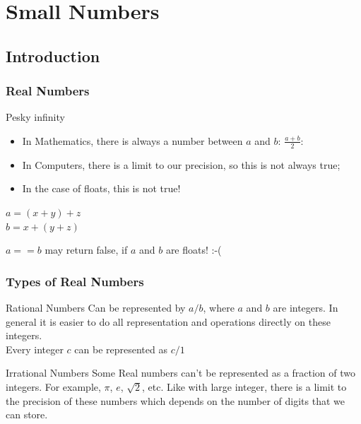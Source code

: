 \documentclass{beamer}
\begin{document}
\section{Small Numbers}
\subsection{Introduction}

\begin{frame}
  \frametitle{Real Numbers}
  \begin{block}{Pesky infinity}
    \begin{itemize}
    \item In Mathematics, there is always a number between $a$ and
      $b$: $\frac{a+b}{2}$:
    \item In Computers, there is a limit to our precision, so this is
      not always true;
    \item In the case of floats, this is  not true!
    \end{itemize}
  \end{block}

  \bigskip
  
  $a = (x + y) + z$\\
  $b = x + (y + z)$\\

  \begin{block}{}
    $a == b$ may return false, if $a$ and $b$ are floats! :-(
  \end{block}
\end{frame}

\begin{frame}
  \frametitle{Types of Real Numbers}
  \begin{block}{Rational Numbers}
    Can be represented by $a/b$, where $a$ and $b$ are integers. In
    general it is easier to do all representation and operations
    directly on these integers.\\
     Every integer $c$ can be represented as $c/1$
  \end{block}
  \begin{block}{Irrational Numbers}
    Some Real numbers can't be represented as a fraction of two
    integers. For example, $\pi$, $e$, $\sqrt{2}$, etc. Like with
    large integer, there is a limit to the precision of these numbers
    which depends on the number of digits that we can store.
  \end{block}
\end{frame}
\end{document}
